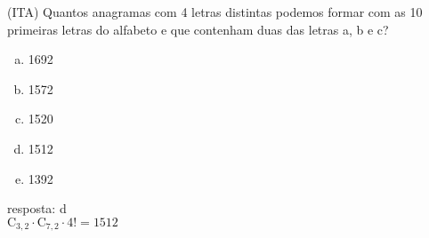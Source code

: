 \begin{ex}
   (ITA) Quantos anagramas com 4 letras distintas podemos formar com as 10 primeiras letras do alfabeto e que contenham duas das letras a, b e c?
   \begin{enumerate} [(a)]
       \item 1692
       \item 1572
       \item 1520
       \item 1512
       \item 1392
   \end{enumerate}
    \begin{sol}
    resposta: d \\
    $\mathrm{C}_{3,2}\cdot\mathrm{C}_{7,2}\cdot4!=1512$
    \end{sol}
 \end{ex}